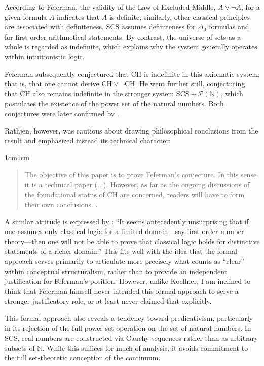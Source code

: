 \documentclass[11pt,a4paper]{book}
\theoremstyle{plain}
\begin{document}
According to Feferman, the validity of the Law of Excluded Middle, $A \lor \neg A$, for a given formula $A$ indicates that $A$ is definite; similarly, other classical principles are associated with definiteness. $\mathrm{SCS}$ assumes definiteness for $\Delta_0$ formulas and for first-order arithmetical statements. By contrast, the universe of sets as a whole is regarded as indefinite, which explains why the system generally operates within intuitionistic logic.

Feferman subsequently conjectured that CH is indefinite in this axiomatic system; that is, that one cannot derive $\mathrm{CH} \lor \neg \mathrm{CH}$. He went further still, conjecturing that CH also remains indefinite in the stronger system $\mathrm{SCS} + \mathcal{P}(\mathbb{N})$, which postulates the existence of the power set of the natural numbers. Both conjectures were later confirmed by \textcite{Rathjen2016}.

Rathjen, however, was cautious about drawing philosophical conclusions from the result and emphasized instead its technical character:

\begin{adjustwidth}{1cm}{1cm}
\begin{quote}
\small
The objective of this paper is to prove Feferman's conjecture. In this sense it is a technical paper (...). However, as far as the ongoing discussions of the foundational status of CH are concerned, readers will have to form their own conclusions. \textcite[p. 743]{Rathjen2016}.
\end{quote}
\end{adjustwidth}

A similar attitude is expressed by \textcite[p. 516]{Koellner2016}: “It seems antecedently unsurprising that if one assumes only classical logic for a limited domain—say first-order number theory—then one will not be able to prove that classical logic holds for distinctive statements of a richer domain.” This fits well with the idea that the formal approach serves primarily to articulate more precisely what counts as “clear” within conceptual structuralism, rather than to provide an independent justification for Feferman's position. However, unlike Koellner, I am inclined to think that Feferman himself never intended this formal approach to serve a stronger justificatory role, or at least never claimed that explicitly.

This formal approach also reveals a tendency toward predicativism, particularly in its rejection of the full power set operation on the set of natural numbers. In SCS, real numbers are constructed via Cauchy sequences rather than as arbitrary subsets of $\mathbb{N}$. While this suffices for much of analysis, it avoids commitment to the full set-theoretic conception of the continuum.
\end{document}

